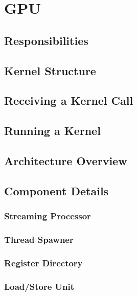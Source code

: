 \chapter{GPU}

\section{Responsibilities}

\section{Kernel Structure}

\section{Receiving a Kernel Call}

\section{Running a Kernel}

\section{Architecture Overview}

\section{Component Details}

\subsection{Streaming Processor}

\subsection{Thread Spawner}

\subsection{Register Directory}

\subsection{Load/Store Unit}

